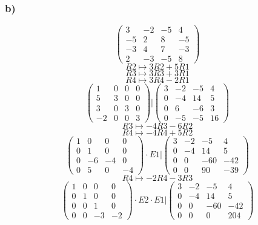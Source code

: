 \documentclass[lineaire_algebra_oplossingen.tex]{subfiles}
\begin{document}
\subsubsection*{b)}
\[
\begin{pmatrix}
3 & -2 & -5 & 4\\
-5 & 2 & 8 & -5\\
-3 & 4 & 7 & -3\\
2 & -3 & -5 & 8
\end{pmatrix}
\]
\[ R2 \longmapsto 3R2 + 5R1 \]
\[ R3 \longmapsto 3R3 + 3R1 \]
\[ R4 \longmapsto 3R4 - 2R1 \]
\[
\left.\begin{pmatrix}
1 & 0 & 0 & 0\\
5 & 3 & 0 & 0\\
3 & 0 & 3 & 0\\
-2 & 0 & 0 & 3
\end{pmatrix}
\right.\Bigg|
\begin{pmatrix}
3 & -2 & -5 & 4\\
0 & -4 & 14 & 5\\
0 & 6 & -6 & 3\\
0 & -5 & -5 & 16
\end{pmatrix}
\]
\[ R3 \longmapsto -4R3 - 6R2 \]
\[ R4 \longmapsto -4R4 + 5R2\]
\[
\left.\begin{pmatrix}
1 & 0 & 0 & 0\\
0 & 1 & 0 & 0\\
0 & -6 & -4 & 0\\
0 & 5 & 0 & -4
\end{pmatrix}
\cdot E1
\right.\Bigg|
\begin{pmatrix}
3 & -2 & -5 & 4\\
0 & -4 & 14 & 5\\
0 & 0 & -60 & -42\\
0 & 0 & 90 & -39
\end{pmatrix}
\]
\[ R4 \longmapsto -2R4 - 3R3 \]
\[
\left.\begin{pmatrix}
1 & 0 & 0 & 0\\
0 & 1 & 0 & 0\\
0 & 0 & 1 & 0\\
0 & 0 & -3 & -2
\end{pmatrix}
\cdot E2 \cdot E1
\right.\Bigg|
\begin{pmatrix}
3 & -2 & -5 & 4\\
0 & -4 & 14 & 5\\
0 & 0 & -60 & -42\\
0 & 0 & 0 & 204
\end{pmatrix}
\]
\end{document}
